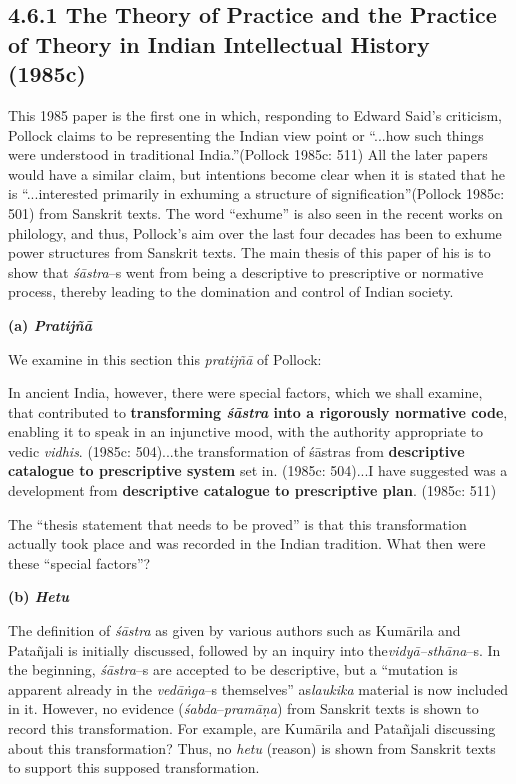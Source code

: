 \subsection*{4.6.1 The Theory of Practice and the Practice of Theory in Indian Intellectual History (1985c)}

This 1985 paper is the first one in which, responding to Edward Said’s criticism, Pollock claims to be representing the Indian view point or “...how such things were understood in traditional India.”(Pollock 1985c: 511) All the later papers would have a similar claim, but intentions become clear when it is stated that he is “...interested primarily in exhuming a structure of signification”(Pollock 1985c: 501) from Sanskrit texts. The word “exhume” is also seen in the recent works on philology, and thus, Pollock’s aim over the last four decades has been to exhume power structures from Sanskrit texts. The main thesis of this paper of his is to show that \textit{śāstra}–s went from being a descriptive to prescriptive or normative process, thereby leading to the domination and control of Indian society.

\textbf{(a) \textit{Pratijñā }}

We examine in this section this \textit{pratijñā} of Pollock:

\begin{myquote}
In ancient India, however, there were special factors, which we shall examine, that contributed to \textbf{transforming \textit{śāstra} into a rigorously normative code}, enabling it to speak in an injunctive mood, with the authority appropriate to vedic \textit{vidhis}. (1985c: 504)...the transformation of śāstras from \textbf{descriptive catalogue to prescriptive system} set in. (1985c: 504)...I have suggested was a development from \textbf{descriptive catalogue to prescriptive plan}. (1985c: 511)
\end{myquote}

The “thesis statement that needs to be proved” is that this transformation actually took place and was recorded in the Indian tradition. What then were these “special factors”?

\textbf{(b) \textit{Hetu}}

The definition of \textit{śāstra }as given by various authors such as Kumārila and Patañjali is initially discussed, followed by an inquiry into the\textit{vidyā–sthāna}–s. In the beginning, \textit{śāstra}–s are accepted to be descriptive, but a “mutation is apparent already in the \textit{vedāṅga}–s themselves” as\textit{laukika} material is now included in it. However, no evidence (\textit{śabda}–\textit{pramāṇa}) from Sanskrit texts is shown to record this transformation. For example, are Kumārila and Patañjali discussing about this transformation? Thus, no \textit{hetu} (reason) is shown from Sanskrit texts to support this supposed transformation.

